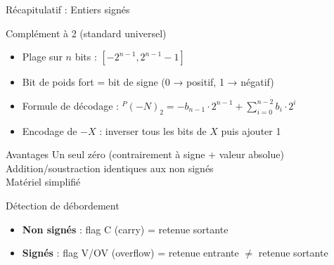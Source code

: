 \documentclass[aspectratio=1610]{beamer}
\begin{document}
%
\begin{frame}{ Récapitulatif : Entiers signés}

  \begin{block}{Complément à 2 (standard universel)}
    \begin{itemize}
      \item Plage sur $n$ bits : $\left[ -2^{n-1}, 2^{n-1}-1 \right]$
      \item Bit de poids fort = bit de signe (0 → positif, 1 → négatif)
      \item Formule de décodage : $^P(-N)_2 = -b_{n-1} \cdot 2^{n-1} + \sum_{i=0}^{n-2} b_i \cdot 2^i$
      \item Encodage de $-X$ : inverser tous les bits de $X$ puis ajouter 1
    \end{itemize}
  \end{block}

  \begin{alertblock}{Avantages}
     Un seul zéro (contrairement à signe + valeur absolue) \\
     Addition/soustraction identiques aux non signés \\
     Matériel simplifié
  \end{alertblock}

  \begin{exampleblock}{Détection de débordement}
    \begin{itemize}
      \item \textbf{Non signés} : flag C (carry) = retenue sortante
      \item \textbf{Signés} : flag V/OV (overflow) = retenue entrante $\neq$ retenue sortante
    \end{itemize}
  \end{exampleblock}

\end{frame}
%
\end{document}
